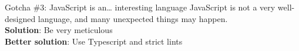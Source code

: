 \documentclass[../index.tex]{subfiles}
\begin{document}
\renewcommand{\currenttitle}{Gotcha \#3: JavaScript is an\ldots{} interesting language}
\begin{frame}[fragile]{\currenttitle}
  JavaScript is not a very well-designed language, and many unexpected things may happen\footnotemark{}. \\[2em]

  \textbf{Solution}: Be very meticulous \\[1em]
  \textbf{Better solution}: Use Typescript and strict lints

\end{frame}

\end{document}
